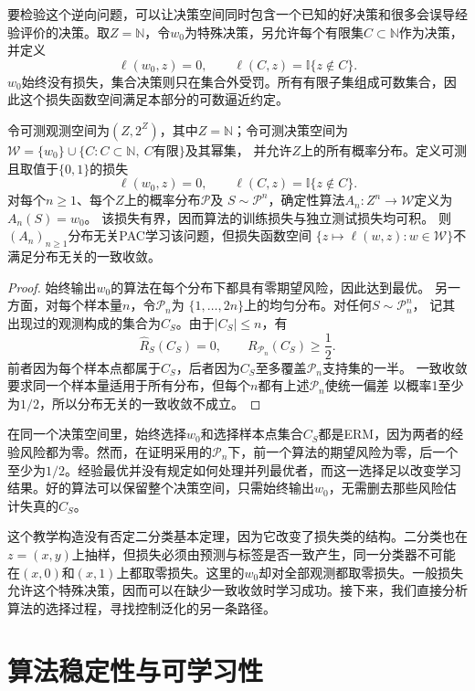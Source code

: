 要检验这个逆向问题，可以让决策空间同时包含一个已知的好决策和很多会误导经验评价的决策。取$Z=\mathbb N$，令$w_0$为特殊决策，另允许每个有限集$C\subset\mathbb N$作为决策，并定义
\[
 \ell(w_0,z)=0,\qquad \ell(C,z)=\mathbb I\{z\notin C\}.
\]
$w_0$始终没有损失，集合决策则只在集合外受罚。所有有限子集组成可数集合，因此这个损失函数空间满足本部分的可数逼近约定。

\begin{theorem}[可学习性不推出一致收敛]
\label{thm:general-learning-without-uniform}
令可测观测空间为$(Z,2^Z)$，其中$Z=\mathbb N$；令可测决策空间为
$\mathcal W=\{w_0\}\cup\{C:C\subset\mathbb N,\ C\text{有限}\}$及其幂集，
并允许$Z$上的所有概率分布。定义可测且取值于$\{0,1\}$的损失
\[
 \ell(w_0,z)=0,\qquad
 \ell(C,z)=\mathbb I\{z\notin C\}.
\]
对每个$n\geq1$、每个$Z$上的概率分布$\mathcal P$及
$S\sim\mathcal P^n$，确定性算法$A_n:Z^n\to\mathcal W$定义为$A_n(S)=w_0$。
该损失有界，因而算法的训练损失与独立测试损失均可积。
则$(A_n)_{n\geq1}$分布无关PAC学习该问题，但损失函数空间
$\{z\mapsto\ell(w,z):w\in\mathcal W\}$不满足分布无关的一致收敛。
\end{theorem}
\begin{proof}
始终输出$w_0$的算法在每个分布下都具有零期望风险，因此达到最优。
另一方面，对每个样本量$n$，令$\mathcal P_n$为
$\{1,\ldots,2n\}$上的均匀分布。对任何$S\sim\mathcal P_n^n$，
记其出现过的观测构成的集合为$C_S$。由于$|C_S|\leq n$，有
\[
 \hat R_S(C_S)=0,\qquad R_{\mathcal P_n}(C_S)\geq\frac12.
\]
前者因为每个样本点都属于$C_S$，后者因为$C_S$至多覆盖$\mathcal P_n$支持集的一半。
一致收敛要求同一个样本量适用于所有分布，但每个$n$都有上述$\mathcal P_n$使统一偏差
以概率1至少为$1/2$，所以分布无关的一致收敛不成立。
\end{proof}

在同一个决策空间里，始终选择$w_0$和选择样本点集合$C_S$都是ERM，因为两者的经验风险都为零。然而，在证明采用的$\mathcal P_n$下，前一个算法的期望风险为零，后一个至少为$1/2$。经验最优并没有规定如何处理并列最优者，而这一选择足以改变学习结果。好的算法可以保留整个决策空间，只需始终输出$w_0$，无需删去那些风险估计失真的$C_S$。

这个教学构造没有否定二分类基本定理，因为它改变了损失类的结构。二分类也在$z=(x,y)$上抽样，但损失必须由预测与标签是否一致产生，同一分类器不可能在$(x,0)$和$(x,1)$上都取零损失。这里的$w_0$却对全部观测都取零损失。一般损失允许这个特殊决策，因而可以在缺少一致收敛时学习成功。接下来，我们直接分析算法的选择过程，寻找控制泛化的另一条路径。

\section{算法稳定性与可学习性}
\label{sec:algorithmic-stability}


